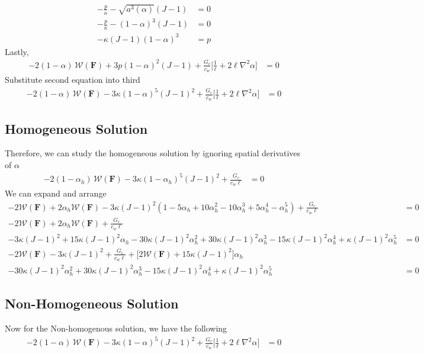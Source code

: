 \documentclass[12pt,3p]{article}
\numberwithin{equation}{section}
\begin{document}
\begin{align*}
-\frac{p}{\kappa} - \sqrt{a^3(\alpha)} (J-1) &= 0 \\
-\frac{p}{\kappa} - (1-\alpha)^3 (J-1) &= 0 \\
- \kappa (J-1)(1-\alpha)^3 &= p
\end{align*}
Lastly,
\begin{align*}
- 2 (1 - \alpha) \, \mathcal{W} (\mathbf{F}) + 3 p (1- \alpha)^2 (J-1) + \frac{G_{c}}{c_{w}} \bigg[ \frac{1}{\ell} + 2 \ell \nabla^2 \alpha \bigg] &= 0 
\end{align*}
Substitute second equation into third
\begin{align*}
- 2 (1 - \alpha) \, \mathcal{W} (\mathbf{F}) - 3 \kappa (1-\alpha)^5 (J-1)^2 + \frac{G_{c}}{c_{w}} \bigg[ \frac{1}{\ell} + 2 \ell \nabla^2 \alpha \bigg] &= 0 
\end{align*}

\subsection{Homogeneous Solution}
Therefore, we can study the homogeneous solution by ignoring spatial derivatives of $\alpha$
\begin{align*}
- 2 (1 - \alpha_{h}) \, \mathcal{W} (\mathbf{F}) - 3 \kappa (1-\alpha_{h})^5 (J-1)^2 + \frac{G_{c}}{c_{w} \ell} &= 0 
\end{align*}
We can expand and arrange
\begin{align*}
- 2 \mathcal{W} (\mathbf{F}) + 2 \alpha_{h} \mathcal{W} (\mathbf{F}) - 3 \kappa(J-1)^2 (1 - 5 \alpha_h + 10 \alpha_h^2 - 10 \alpha_h^3 + 5 \alpha_h^4 - \alpha_h^5) + \frac{G_{c}}{c_{w} \ell} &= 0 \\
- 2 \mathcal{W} (\mathbf{F}) + 2 \alpha_{h} \mathcal{W} (\mathbf{F}) + \frac{G_{c}}{c_{w} \ell} \\
- 3 \kappa(J-1)^2 + 15 \kappa(J-1)^2 \alpha_h - 30 \kappa(J-1)^2 \alpha_h^2 + 30 \kappa(J-1)^2 \alpha_h^3 - 15 \kappa(J-1)^2 \alpha_h^4 + \kappa(J-1)^2 \alpha_h^5 &= 0 \\
- 2 \mathcal{W} (\mathbf{F}) - 3 \kappa(J-1)^2 + \frac{G_{c}}{c_{w} \ell} + \big[ 2 \mathcal{W} (\mathbf{F}) + 15 \kappa(J-1)^2 \big] \alpha_h \\
- 30 \kappa(J-1)^2 \alpha_h^2 + 30 \kappa(J-1)^2 \alpha_h^3 - 15 \kappa(J-1)^2 \alpha_h^4 + \kappa(J-1)^2 \alpha_h^5 &= 0
\end{align*}

\subsection{Non-Homogeneous Solution}
Now for the Non-homogenous solution, we have the following
\begin{align*}
- 2 (1 - \alpha) \, \mathcal{W} (\mathbf{F}) - 3 \kappa (1-\alpha)^5 (J-1)^2 + \frac{G_{c}}{c_{w}} \bigg[ \frac{1}{\ell} + 2 \ell \nabla^2 \alpha \bigg] &= 0 
\end{align*}
\end{document}
